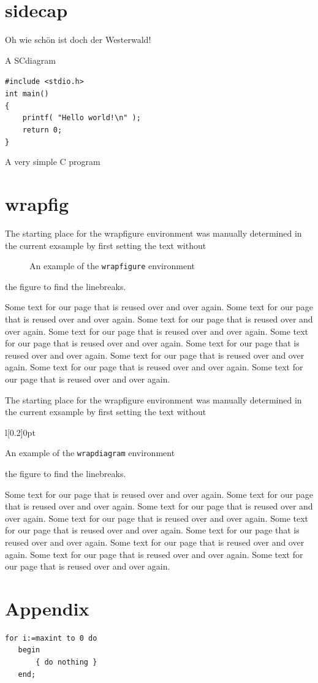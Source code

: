 \documentclass{article}
\begin{document}
\ifdefined\SCdiagram
\chapter{sidecap}

\begin{SCdiagram}
\strut Oh wie sch\"on ist doch der Westerwald!
\caption{A SCdiagram}
\end{SCdiagram}
\begin{SCprogram}
  \verb|#include <stdio.h>|\\
  \verb|int main()|\\
  \verb|{|\\
  \verb|    printf( "Hello world!\n" );|\\
  \verb|    return 0;|\\
  \verb|}|
  \caption{A very simple C program}
\end{SCprogram}
\fi

\ifdefined\wrapdiagram
\chapter{wrapfig}

\newcommand\sample{Some text for our page
 that is reused over and over again. }

The starting place for the wrapfigure
environment was manually determined in
the current exsample by first setting the text without
\begin{figure}
  \centering
  \caption{An example of the
    \texttt{wrapfigure} environment}
\end{figure}
the figure to find the linebreaks.

\sample \sample \sample
\sample \sample \sample
\sample \sample \sample

The starting place for the wrapfigure
environment was manually determined in
the current exsample by first setting the text without
\begin{wrapdiagram}[7]{l}[0.2\width]{0pt}
  \centering
  \caption{An example of the
    \texttt{wrapdiagram} environment}
\end{wrapdiagram}
the figure to find the linebreaks.

\sample \sample \sample
\sample \sample \sample
\sample \sample \sample
\fi

\chapter{Appendix}

   \begin{lstlisting}[caption={Useless code},label=useless2,captionpos=t]
   for i:=maxint to 0 do
   begin
       { do nothing }
   end;
   \end{lstlisting}
\end{document}

